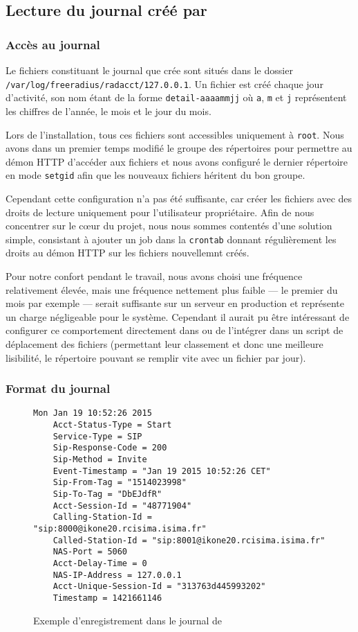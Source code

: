 \subsection{Lecture du journal créé par \frad}

\subsubsection{Accès au journal}

Le fichiers constituant le journal que crée {\frad} sont situés dans le dossier \texttt{/var/log/freeradius/radacct/127.0.0.1}. Un fichier est créé chaque jour d’activité, son nom étant de la forme \texttt{detail-aaaammjj} où \texttt{a}, \texttt{m} et \texttt{j} représentent les chiffres de l’année, le mois et le jour du mois.

Lors de l’installation, tous ces fichiers sont accessibles uniquement à \texttt{root}. Nous avons dans un premier temps modifié le groupe des répertoires pour permettre au démon HTTP d’accéder aux fichiers et nous avons configuré le dernier répertoire en mode \texttt{setgid} afin que les nouveaux fichiers héritent du bon groupe.

Cependant cette configuration n’a pas été suffisante, car {\frad} créer les fichiers avec des droits de lecture uniquement pour l’utilisateur propriétaire. Afin de nous concentrer sur le cœur du projet, nous nous sommes contentés d’une solution simple, consistant à ajouter un job dans la \texttt{crontab} donnant régulièrement les droits au démon HTTP sur les fichiers nouvellemnt créés.

Pour notre confort pendant le travail, nous avons choisi une fréquence relativement élevée, mais une fréquence nettement plus faible — le premier du mois par exemple — serait suffisante sur un serveur en production et représente un charge négligeable pour le système. Cependant il aurait pu être intéressant de configurer ce comportement directement dans {\frad} ou de l’intégrer dans un script de déplacement des fichiers (permettant leur classement et donc une meilleure lisibilité, le répertoire pouvant se remplir vite avec un fichier par jour).

\subsubsection{Format du journal}

\begin{figure}[h!]
\begin{verbatim}
Mon Jan 19 10:52:26 2015
	Acct-Status-Type = Start
	Service-Type = SIP
	Sip-Response-Code = 200
	Sip-Method = Invite
	Event-Timestamp = "Jan 19 2015 10:52:26 CET"
	Sip-From-Tag = "1514023998"
	Sip-To-Tag = "DbEJdfR"
	Acct-Session-Id = "48771904"
	Calling-Station-Id = "sip:8000@ikone20.rcisima.isima.fr"
	Called-Station-Id = "sip:8001@ikone20.rcisima.isima.fr"
	NAS-Port = 5060
	Acct-Delay-Time = 0
	NAS-IP-Address = 127.0.0.1
	Acct-Unique-Session-Id = "313763d445993202"
	Timestamp = 1421661146
\end{verbatim}
\caption{Exemple d’enregistrement dans le journal de \frad}
\label{radrecord}
\end{figure}


